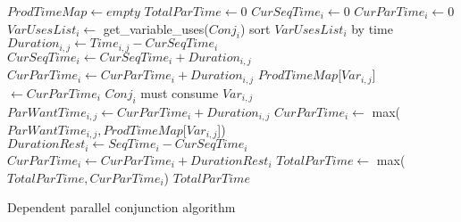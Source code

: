 \begin{algorithm}[tbp]
\begin{algorithmic}[1]
    \State $ProdTimeMap \gets empty$
    \State $TotalParTime \gets 0$
        \State $CurSeqTime_i \gets 0$
        \State $CurParTime_i \gets 0$
        \State $VarUsesList_i \gets$ get\_variable\_uses($Conj_i$)
        \State sort $VarUsesList_i$ by time
            \State $Duration_{i, j} \gets Time_{i, j} - CurSeqTime_i$
            \State $CurSeqTime_i \gets CurSeqTime_i + Duration_{i, j}$
                \State $CurParTime_i \gets CurParTime_i + Duration_{i, j}$
                \State $ProdTimeMap$[$Var_{i, j}$]~$ \gets CurParTime_i$
            \Else
                \Comment $Conj_i$ must consume $Var_{i, j}$
                \State $ParWantTime_{i, j} \gets CurParTime_i + Duration_{i, j}$
                \State $CurParTime_i \gets$
                    max($ParWantTime_{i, j}, ProdTimeMap$[$Var_{i, j}$])
            \EndIf
        \EndFor
        \State $DurationRest_i \gets SeqTime_i - CurSeqTime_i$
        \State $CurParTime_i \gets CurParTime_i + DurationRest_i$
        \State $TotalParTime \gets$ max($TotalParTime, CurParTime_i$)
    \EndFor
    \State \Return $TotalParTime$
\EndProcedure
\end{algorithmic}
\caption{Dependent parallel conjunction algorithm}
\label{alg:dep_par_conj_overlap_middle}
\end{algorithm}

